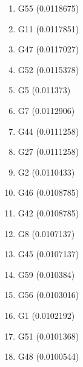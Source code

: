 \begin{enumerate}
\item G55 (0.0118675)
\item G11 (0.0117851)
\item G47 (0.0117027)
\item G52 (0.0115378)
\item G5 (0.011373)
\item G7 (0.0112906)
\item G44 (0.0111258)
\item G27 (0.0111258)
\item G2 (0.0110433)
\item G46 (0.0108785)
\item G42 (0.0108785)
\item G8 (0.0107137)
\item G45 (0.0107137)
\item G59 (0.010384)
\item G56 (0.0103016)
\item G1 (0.0102192)
\item G51 (0.0101368)
\item G48 (0.0100544)
\end{enumerate}